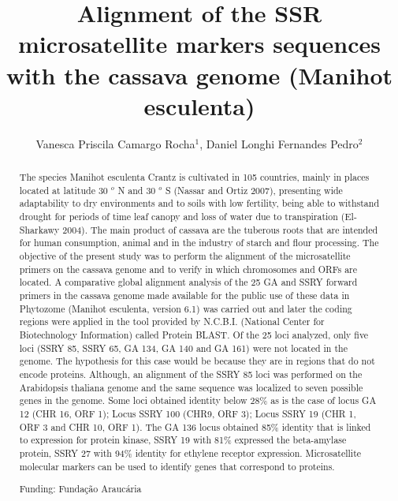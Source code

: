 \documentclass[twoside]{article}
\title{\vspace{-15mm}\fontsize{24pt}{10pt}\selectfont\textbf{Alignment of the SSR microsatellite markers sequences with the cassava genome (Manihot esculenta)}} %
\author{Vanesca Priscila Camargo Rocha$^1$, Daniel Longhi Fernandes Pedro$^2$}
\affil{1 UNIVERSIDADE TECNOL\'OGICA FEDERAL DO PARAN\'A\\ 2 UTFPR - PPGBIOINFO\\ }
\date{}
\begin{document}
\maketitle %

\thispagestyle{fancy} %


\begin{abstract}
The species Manihot esculenta Crantz is cultivated in 105 countries, mainly in places located at latitude 30 $^o$ N and 30 $^o$ S (Nassar and Ortiz 2007), presenting wide adaptability to dry environments and to soils with low fertility, being able to withstand drought for periods of time leaf canopy and loss of water due to transpiration (El-Sharkawy 2004). The main product of cassava are the tuberous roots that are intended for human consumption, animal and in the industry of starch and flour processing. The objective of the present study was to perform the alignment of the microsatellite primers on the cassava genome and to verify in which chromosomes and ORFs are located. A comparative global alignment analysis of the 25 GA and SSRY forward primers in the cassava genome made available for the public use of these data in Phytozome (Manihot esculenta, version 6.1) was carried out and later the coding regions were applied in the tool provided by N.C.B.I. (National Center for Biotechnology Information) called Protein BLAST. Of the 25 loci analyzed, only five loci (SSRY 85, SSRY 65, GA 134, GA 140 and GA 161) were not located in the genome. The hypothesis for this case would be because they are in regions that do not encode proteins. Although, an alignment of the SSRY 85 loci was performed on the Arabidopsis thaliana genome and the same sequence was localized to seven possible genes in the genome. Some loci obtained identity below 28\% as is the case of locus GA 12 (CHR 16, ORF 1); Locus SSRY 100 (CHR9, ORF 3); Locus SSRY 19 (CHR 1, ORF 3 and CHR 10, ORF 1). The GA 136 locus obtained 85\% identity that is linked to expression for protein kinase, SSRY 19 with 81\% expressed the beta-amylase protein, SSRY 27 with 94\% identity for ethylene receptor expression. Microsatellite molecular markers can be used to identify genes that correspond to proteins.

Funding: Funda\c{c}\~ao Arauc\'aria
\end{abstract}
\end{document}
